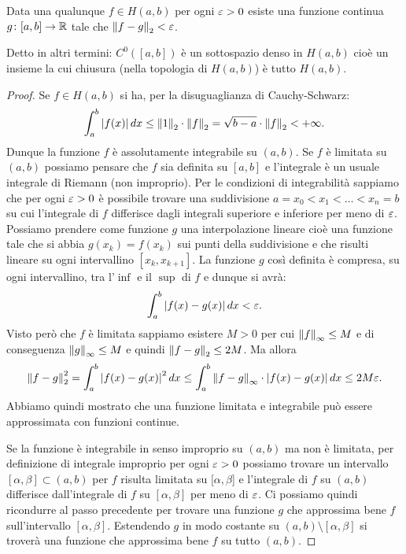 \begin{theorem}
Data una qualunque $f\in H(a, b)$ per ogni $\varepsilon>0$
esiste una funzione continua $g\colon [a,b]\to {\mathbb R}$
tale che ${\left\Vert f-g\right\Vert}_2<\varepsilon$.

Detto in altri termini: $C^0([a,b])$ è un sottospazio denso in $H(a,b)$
cioè un insieme la cui chiusura (nella topologia di $H(a,b)$) è tutto $H(a,b)$.
\end{theorem}
%
\begin{proof}
Se $f\in H(a,b)$ si ha,
per la disuguaglianza di Cauchy-Schwarz:
\[
  \int_a^b {\left|f(x)\right|}\, dx
  \le {\left\Vert 1\right\Vert}_2 \cdot {\left\Vert f\right\Vert}_2 = \sqrt{b-a}\cdot {\left\Vert f\right\Vert}_2 < +\infty.
\]
Dunque la funzione $f$ è assolutamente integrabile su $(a,b)$.
Se $f$ è limitata su $(a,b)$ possiamo pensare che $f$ sia definita su $[a,b]$
e l'integrale è un usuale integrale di Riemann (non improprio).
Per le condizioni di integrabilità sappiamo che per ogni $\varepsilon>0$ è possibile
trovare una suddivisione $a=x_0 < x_1 < \dots < x_n =b$ su cui l'integrale
di $f$ differisce dagli integrali superiore e inferiore per meno di $\varepsilon$.
Possiamo prendere come funzione $g$ una interpolazione lineare
cioè una funzione tale che si abbia $g(x_k) = f(x_k)$ sui punti della suddivisione
e che risulti lineare su ogni intervallino $[x_k,x_{k+1}]$. La funzione
$g$ così definita è compresa, su ogni intervallino, tra l'$\inf$ e il $\sup$
di $f$ e dunque si avrà:
\[
 \int_a^b {\left|f(x)-g(x)\right|}\, dx < \varepsilon.
\]
Visto però che $f$ è limitata sappiamo esistere $M>0$ per cui ${\left\Vert f\right\Vert}_\infty\le M$
e di conseguenza ${\left\Vert g\right\Vert}_\infty\le M$ e quindi ${\left\Vert f-g\right\Vert}_2\le 2M$.
Ma allora
\[
  {\left\Vert f-g\right\Vert}_2^2 = \int_a^b {\left|f(x)-g(x)\right|}^2\, dx
  \le \int_a^b {\left\Vert f-g\right\Vert}_\infty \cdot {\left|f(x)-g(x)\right|}\, dx
  \le 2M \varepsilon.
\]
Abbiamo quindi mostrato che una funzione limitata e integrabile può essere
approssimata con funzioni continue.

Se la funzione è integrabile in senso improprio su $(a,b)$ ma non è limitata, per
definizione di integrale improprio per ogni $\varepsilon>0$ possiamo trovare un intervallo
$[\alpha,\beta]\subset (a,b)$
per $f$ risulta limitata su $[\alpha,\beta$] e
l'integrale di $f$ su $(a,b)$ differisce dall'integrale di $f$ su $[\alpha,\beta]$
per meno di $\varepsilon$. Ci possiamo quindi ricondurre al passo precedente
per trovare una funzione $g$ che approssima bene $f$ sull'intervallo $[\alpha,\beta]$.
Estendendo $g$ in modo costante su $(a,b)\setminus[\alpha,\beta]$ si troverà
una funzione che approssima bene $f$ su tutto $(a,b)$.
\end{proof}


